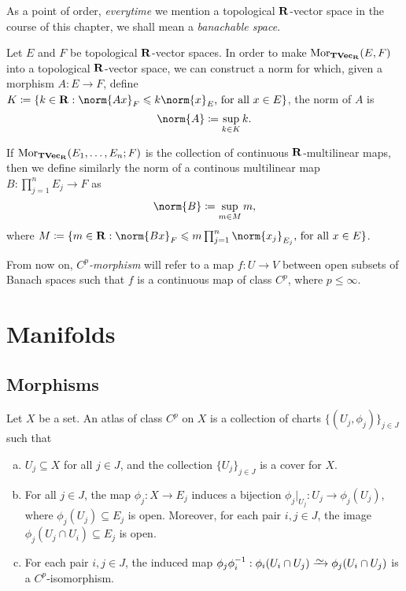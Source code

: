 As a point of order, \emph{everytime} we mention a topological \(\mathbf{R}\)-vector
space in the course of this chapter, we shall mean a \emph{banachable space}.

\begin{definition}
\label{def:norm-morphism-TopVect}
Let \(E\) and \(F\) be topological \(\mathbf{R}\)-vector spaces. In order to make
\(\operatorname{Mor}_{{\textbf{TVec}}_{\mathbf{R}}}(E, F)\) into a topological \(\mathbf{R}\)-vector space, we can
construct a norm for which, given a morphism \(A: E \to F\), define \(K \coloneq
\{k \in \R : \norm{Ax}_{F} \leq k \norm{x}_E \text{, for all } x \in E\}\), the
norm of \(A\) is
\[
  \norm{A} \coloneq \sup_{k \in K} k.
\]

If \(\operatorname{Mor}_{{\textbf{TVec}}_{\mathbf{R}}}(E_1, \dots, E_n; F)\) is the collection of continuous
\(\mathbf{R}\)-multilinear maps, then we define similarly the norm of a continous
multilinear map \(B: \prod_{j=1}^n E_j \to F\) as
\[
  \norm{B} \coloneq \sup_{m \in M} m,
\]
where \(M \coloneq \{m \in \R : \norm{Bx}_F \leq m \prod_{j=1}^n
\norm{x_j}_{E_j} \text{, for all } x \in E\}\).
\end{definition}

\begin{remark}
\label{rm:Cp-morphism}
From now on, \emph{\(C^p\)-morphism} will refer to a map \(f: U \to V\) between
open subsets of Banach spaces such that \(f\) is a continuous map of class
\(C^p\), where \(p \leq \infty\).
\end{remark}

\section{Manifolds}

\subsection{Morphisms}

\begin{definition}[Atlas]
\label{def:Cp-atlas}
Let \(X\) be a set. An atlas of class \(C^p\) on \(X\) is a collection of charts
\(\{(U_{j}, \phi_j)\}_{j \in J}\) such that
\begin{enumerate}[(a)]\setlength\itemsep{0em}
\item \(U_j \subseteq X\) for all \(j \in J\), and the collection \(\{U_{j}\}_{j
  \in J}\) is a cover for \(X\).

\item For all \(j \in J\), the map \(\phi_j: X \to E_j\) induces a bijection
  \(\phi_j|_{U_j}: U_j \to \phi_j(U_j)\), where \(\phi_j(U_j) \subseteq E_j\) is
  open. Moreover, for each pair \(i, j \in J\), the image \(\phi_j(U_j \cap U_i)
  \subseteq E_j\) is open.

\item For each pair \(i, j \in J\), the induced map \(\phi_j \phi_i^{-1}:
  \phi_i(U_i \cap U_j) \isoto \phi_j(U_i \cap U_j)\) is a \(C^p\)-isomorphism.
\end{enumerate}
\end{definition}

